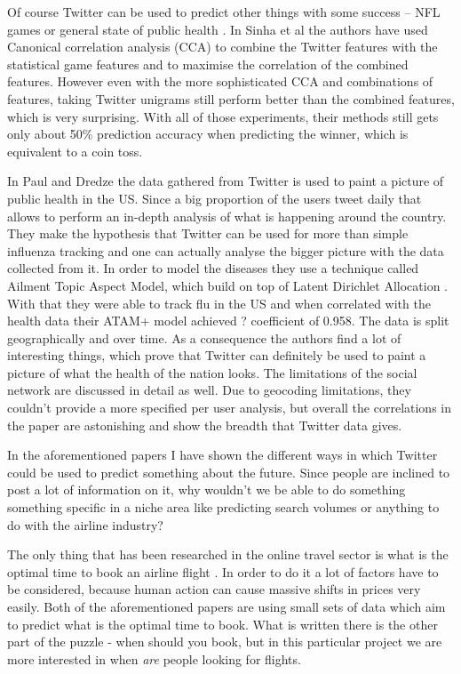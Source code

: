\documentclass[minf,twoside,singlespacing,parskip,frontabs,notimes,11pt]{infthesis}
\begin{document}
Of course Twitter can be used to predict other things with some success -- NFL games \cite{twitnfl} or general state of public health \cite{twitflu}.  In Sinha et al \cite{twitnfl} the authors have used Canonical correlation analysis (CCA) to combine the Twitter features with the statistical game features and to maximise the correlation of the combined features. However even with the more sophisticated CCA and combinations of features, taking Twitter unigrams still perform better than the combined features, which is very surprising. With all of those experiments, their methods still gets only about 50\% prediction accuracy when predicting the winner, which is equivalent to a coin toss. 

In Paul and Dredze \cite{twitflu} the data gathered from Twitter is used to paint a picture of public health in the US. Since a big proportion of the users tweet daily \cite{TwitStat} that allows to perform an in-depth analysis of what is happening around the country. They make the hypothesis that Twitter can be used for more than simple influenza tracking and one can actually analyse the bigger picture with the data collected from it. In order to model the diseases they use a technique called Ailment Topic Aspect Model, which build on top of Latent Dirichlet Allocation \cite{lda}. With that they were able to track flu in the US and when correlated with the health data their ATAM+ model achieved ? coefficient of 0.958. The data is split geographically and over time. As a consequence the authors find a lot of interesting things, which prove that Twitter can definitely be used to paint a picture of what the health of the nation looks. The limitations of the social network are discussed in detail as well. Due to geocoding limitations, they couldn't provide a more specified per user analysis, but overall the correlations in the paper are astonishing and show the breadth that Twitter data gives. 


In the aforementioned papers I have shown the different ways in which Twitter could be used to predict something about the future. Since people are inclined to post a lot of information on it, why wouldn't we be able to do something something specific in a niche area like predicting search volumes or anything to do with the airline industry?

The only thing that has been researched in the online travel sector is what is the optimal time to book an airline flight \cite{Hamletkdd03,ijcai}.  In order to do it a lot of factors have to be considered, because human action can cause massive shifts in prices very easily. 
Both of the aforementioned papers are using small sets of data which aim to predict what is the optimal time to book. What is written there is the other part of the puzzle - when should you book, but in this particular project we are more interested in when \textit{are} people looking for flights.
\end{document}
